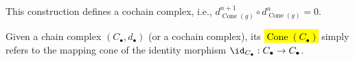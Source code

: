 \begin{definition}
\begin{enumerate}
        This construction defines a cochain complex, i.e., $d_{\operatorname{Cone}(g)}^{n+1} \circ d_{\operatorname{Cone}(g)}^n = 0$.
        \end{enumerate}
    Given a chain complex $(C_\bullet, d_\bullet)$ (or a cochain complex), its  \hl{$\operatorname{Cone}(C_\bullet)$} simply refers to the mapping cone of the identity morphism $\id_{C_\bullet}: C_\bullet \to C_\bullet$. 
\end{definition}